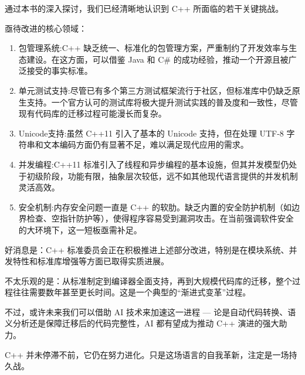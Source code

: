 通过本书的深入探讨，我们已经清晰地认识到 C++ 所面临的若干关键挑战。

亟待改进的核心领域：

\begin{enumerate}
\item 
包管理系统:C++ 缺乏统一、标准化的包管理方案，严重制约了开发效率与生态建设。在这方面，可以借鉴 Java 和 C\# 的成功经验，推动一个开源且被广泛接受的事实标准。

\item 
单元测试支持:尽管已有多个第三方测试框架流行于社区，但标准库中仍缺乏原生支持。一个官方认可的测试库将极大提升测试实践的普及度和一致性，尽管现有代码库的迁移过程可能漫长而复杂。

\item 
Unicode支持:虽然 C++11 引入了基本的 Unicode 支持，但在处理 UTF-8 字符串和文本编码方面仍有显著不足，难以满足现代应用的需求。

\item 
并发编程:C++11 标准引入了线程和异步编程的基本设施，但其并发模型仍处于初级阶段，功能有限，抽象层次较低，远不如其他现代语言提供的并发机制灵活高效。

\item 
安全机制:内存安全问题一直是 C++ 的软肋。缺乏内置的安全防护机制（如边界检查、空指针防护等），使得程序容易受到漏洞攻击。在当前强调软件安全的大环境下，这一短板亟需补足。
\end{enumerate}

好消息是：C++ 标准委员会正在积极推进上述部分改进，特别是在模块系统、并发特性和标准库增强等方面已取得实质进展。

不太乐观的是：从标准制定到编译器全面支持，再到大规模代码库的迁移，整个过程往往需要数年甚至更长时间。这是一个典型的“渐进式变革”过程。

不过，或许未来我们可以借助 AI 技术来加速这一进程 --- 论是自动代码转换、语义分析还是保障迁移后的代码完整性，AI 都有望成为推动 C++ 演进的强大助力。

C++ 并未停滞不前，它仍在努力进化。只是这场语言的自我革新，注定是一场持久战。










